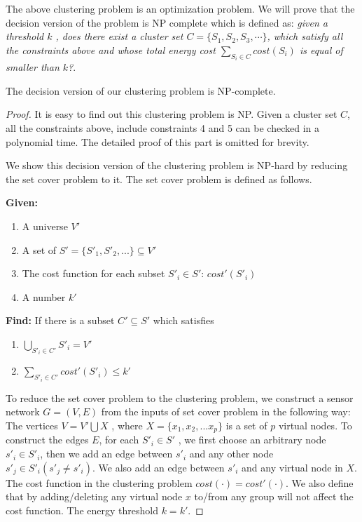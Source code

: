 The above clustering problem is an optimization problem. We will prove that the decision version of the problem is NP complete which is defined as: \emph{given a threshold \(k\) , does there exist a cluster set \(C=\{S_1, S_2, S_3, \cdots\}\), which satisfy all the constraints above and whose total energy cost \(\sum\limits_{S_i \in C} cost(S_i)\) is equal of smaller than \(k\)?}.

\begin{theorem}
The decision version of our clustering problem is NP-complete.
\end{theorem}

\begin{proof}
It is easy to find out this clustering problem is NP.  Given a cluster set \(C\), all the constraints above, include constraints 4 and 5 can be checked in a polynomial time. The detailed proof of this part is omitted for brevity.

We show this decision version of the clustering problem is NP-hard by reducing the set cover problem to it. The set cover problem is defined as follows.

\begin{flushleft}
\textbf{Given:}
\end{flushleft}
\begin{enumerate}
\item A universe \(V'\)
\item A set of \(S'=\{S'_1, S'_2, ...\}\subseteq V'\)
\item The cost function for each subset \(S'_i\in S'\): \(cost'(S'_i)\) 
\item A number \(k'\)
\end{enumerate}
\textbf{Find: }
If there is a subset \(C'\subseteq S'\) which satisfies
\begin{enumerate}
\item \( \bigcup\limits_{S'_i \in C'} S'_i =V'\)
\item \( \sum\limits_{S'_i \in C'} cost'(S'_i) \leq k'\)
\end{enumerate}

To reduce the set cover problem to the clustering problem, we construct a sensor network \(G=(V, E)\) from the inputs of set cover problem in the following way:
The vertices \(V =V'\bigcup X\) , where \(X = \{x_1,x_2,...x_p\}\)  is a set of \(p\) virtual nodes. 
To construct the edges \(E\), for each \(S'_i\in S'\) , we first choose an arbitrary  node \(s'_i\in S'_i\), then we add an edge between \(s'_i\) and any other node \(s'_j \in S'_i (s'_j\neq s'_i)\). We also add an edge between \(s'_i\) and any virtual node in \(X\). 
The cost function in the clustering problem \(cost(\cdot) = cost'(\cdot)\). We also define that by adding/deleting any virtual node \(x\) to/from any group will not affect the cost function. The energy threshold \(k=k'\). 


\end{proof}

